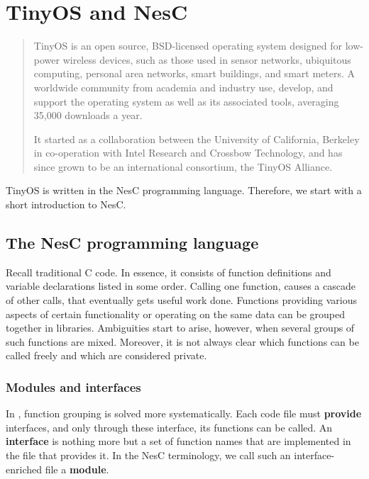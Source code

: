 \chapter{TinyOS and NesC}
\label{ch:tos_and_nesc}

\begin{quotation}
TinyOS is an open source, BSD-licensed operating system designed for low-power wireless devices, such as those used in sensor networks, ubiquitous computing, personal area networks, smart buildings, and smart meters. A worldwide community from academia and industry use, develop, and support the operating system as well as its associated tools, averaging 35,000 downloads a year.

It started as a collaboration between the University of California, Berkeley in co-operation with Intel Research and Crossbow Technology, and has since grown to be an international consortium, the TinyOS Alliance.

{\hfill \cite{TOSnet,TOSw}}
\end{quotation}

TinyOS is written in the NesC programming language. Therefore, we start with a short introduction to NesC.

\section{The NesC programming language}

Recall traditional C code. In essence, it consists of function definitions and variable declarations listed in some order. Calling one function, causes a cascade of other calls, that eventually gets useful work done. Functions providing various aspects of certain functionality or operating on the same data can be grouped together in libraries. Ambiguities start to arise, however, when several groups of such functions are mixed. Moreover, it is not always clear which functions can be called freely and which are considered private.

\subsection{Modules and interfaces}

In \cite{NesC}, function grouping is solved more systematically. Each code file must {\bf provide} interfaces, and only through these interface, its functions can be called. An {\bf interface} is nothing more but a set of function names that are implemented in the file that provides it. In the NesC terminology, we call such an interface-enriched file a {\bf module}.

